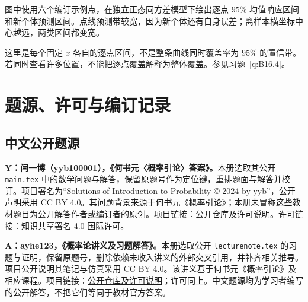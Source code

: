 \documentclass[UTF8,12pt,a4paper,fontset=fandol]{ctexbook}
\begin{document}
\begin{center}
\end{center}

图中使用六个编订示例点，在独立正态同方差模型下绘出逐点 $95\%$ 均值响应区间和新个体预测区间。点线预测带较宽，因为新个体还有自身误差；离样本横坐标中心越远，两类区间都变宽。

这里是每个固定 $x$ 各自的逐点区间，不是整条曲线同时覆盖率为 $95\%$ 的置信带。若同时查看许多位置，不能把逐点覆盖解释为整体覆盖。参见习题~\ref{q:B16.4}。

\clearpage
\section*{题源、许可与编订记录}
\subsection*{中文公开题源}
\textbf{Y：闫一博（yyb100001），《何书元〈概率引论〉答案》。}本册选取其公开 \texttt{main.tex} 中的数学问题与解答，保留原题号作为定位键，重排题面与解答并校订。项目署名为“Solutions-of-Introduction-to-Probability © 2024 by yyb”，公开声明采用 CC BY 4.0。其问题背景来源于何书元《概率引论》；本册未冒称这些教材题目为公开解答作者或编订者的原创。项目链接：\href{https://github.com/yyb100001/Solutions-of-Introduction-to-Probability}{公开仓库及许可说明}。许可链接：\href{https://creativecommons.org/licenses/by/4.0/}{知识共享署名 4.0 国际许可}。

\textbf{A：ayhe123，《概率论讲义及习题解答》。}本册选取公开 \texttt{lecturenote.tex} 的习题与证明，保留原题号，删除依赖未收入讲义的外部交叉引用，并补齐相关推导。项目公开说明其笔记与仿真采用 CC BY 4.0。该讲义基于何书元《概率引论》及相应课程。项目链接：\href{https://github.com/ayhe123/probabilityTheory-lecturenote}{公开仓库及许可说明}；许可同上。中文题源均为学习者编写的公开解答，不把它们等同于教材官方答案。
\end{document}
